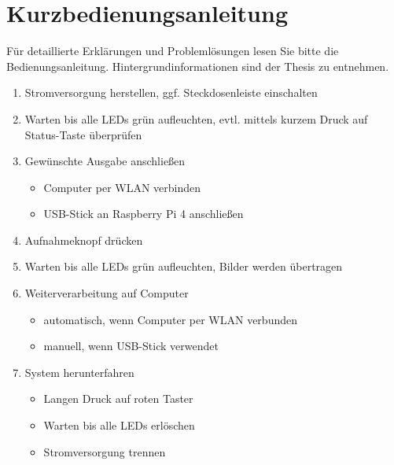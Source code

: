 \documentclass[./00PhotoBox.tex]{subfiles}
\begin{document}
\chapter{Kurzbedienungsanleitung}

Für detaillierte Erklärungen und Problemlösungen lesen Sie bitte die Bedienungsanleitung. Hintergrundinformationen sind der Thesis zu entnehmen.


\begin{enumerate}
    \item Stromversorgung herstellen, ggf. Steckdosenleiste einschalten
    \item Warten bis alle LEDs grün aufleuchten, evtl. mittels kurzem Druck auf Status-Taste überprüfen
    \item Gewünschte Ausgabe anschließen
          \begin{itemize}
              \item Computer per WLAN verbinden
              \item USB-Stick an Raspberry Pi 4 anschließen
          \end{itemize}
    \item Aufnahmeknopf drücken
    \item Warten bis alle LEDs grün aufleuchten, Bilder werden übertragen
    \item Weiterverarbeitung auf Computer
          \begin{itemize}
              \item au\-to\-ma\-tisch, wenn Computer per WLAN verbunden
              \item manuell, wenn USB-Stick verwendet
          \end{itemize}
    \item System herunterfahren
          \begin{itemize}
              \item Langen Druck auf roten Taster
              \item Warten bis alle LEDs erlöschen
              \item Stromversorgung trennen
          \end{itemize}
\end{enumerate}
\end{document}
